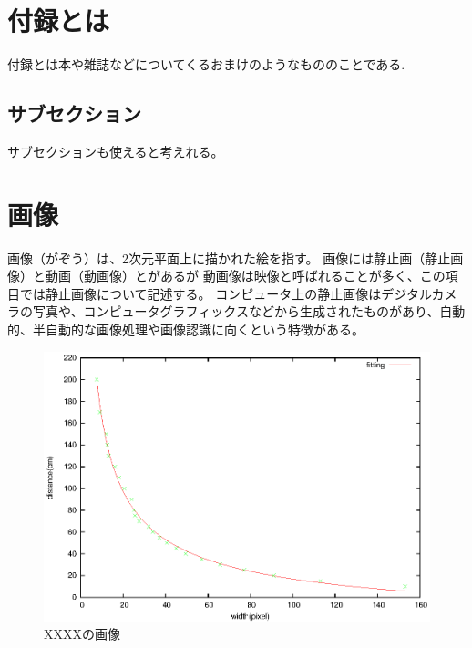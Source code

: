 \section{付録とは}
付録とは本や雑誌などについてくるおまけのようなもののことである.

\subsection{サブセクション}
サブセクションも使えると考えれる。


\newpage
\section{画像}
画像（がぞう）は、2次元平面上に描かれた絵を指す。
画像には静止画（静止画像）と動画（動画像）とがあるが
動画像は映像と呼ばれることが多く、この項目では静止画像について記述する。
コンピュータ上の静止画像はデジタルカメラの写真や、コンピュータグラフィックスなどから生成されたものがあり、自動的、半自動的な画像処理や画像認識に向くという特徴がある。

\begin{figure}[htbp]
\begin{center}
\includegraphics[width=0.5\linewidth]{appendix/eps/pixy.eps}
\caption{XXXXの画像}
\label{ラベルの名前}
\end{center}
\end{figure}

\newpage

